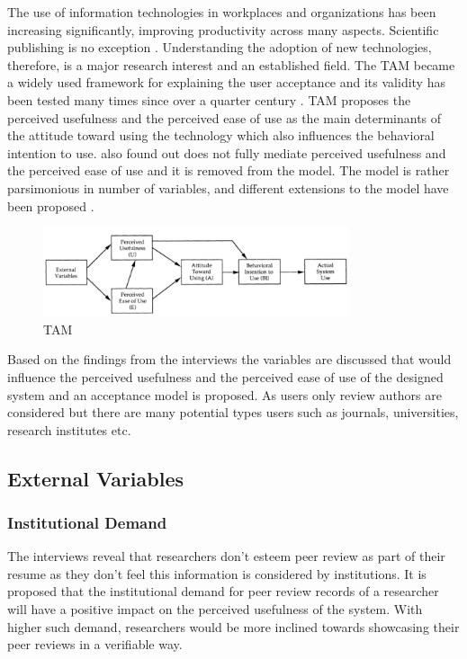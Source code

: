 The use of information technologies in workplaces and organizations has been increasing significantly, improving productivity across many aspects. Scientific publishing is no exception \parencite[132]{Ware.2015}. Understanding the adoption of new technologies, therefore, is a major research interest and an established field. The \acrlong{TAM} \parencite{Davis.1985, Davis.1989, Davis.1989b} became a widely used framework for explaining the user acceptance and its validity has been tested many times since over a quarter century \parencite{Marangunic.2015}. \acrshort{TAM} proposes the perceived usefulness and the perceived ease of use as the main determinants of the attitude toward using the technology which also influences the behavioral intention to use. \cite{Davis.1989b} also found out does not fully mediate perceived usefulness and the
perceived ease of use and it is removed from the model. The model is rather parsimonious in number of variables, and different extensions to the model have been proposed \parencite{Marangunic.2015}. 

\begin{figure}[htpb]
  \centering
  \includegraphics[width=0.8\textwidth]{figures/TAM.png}
  \caption{\acrlong{TAM} \parencite{Davis.1989b} } \label{fig:tam}
\end{figure}

Based on the findings from the interviews the variables are discussed that would influence the perceived usefulness and the perceived ease of use of the designed system and an acceptance model is proposed. As users only review authors are considered but there are many potential types users such as journals, universities, research institutes etc. 

\subsection{External Variables}

\subsubsection{Institutional Demand}

The interviews reveal that researchers don't esteem peer review as part of their resume as they don't feel this information is considered by institutions. It is proposed that the institutional demand for peer review records of a researcher will have a positive impact on the perceived usefulness of the system. With higher such demand, researchers would be more inclined towards showcasing their peer reviews in a verifiable way. 

